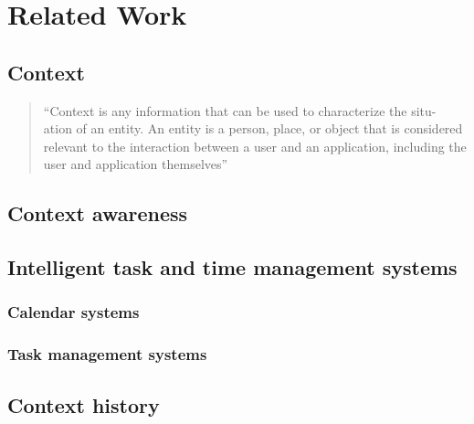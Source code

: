 \chapter{Related Work}
\label{chap:relatedwork}

\section{Context}
\begin{quote}
``Context is any information that can be used to characterize the situ- ation of an entity.
An entity is a person, place, or object that is considered relevant to the interaction
between a user and an application, including the user and application themselves''
\end{quote}

\section{Context awareness}

\section{Intelligent task and time management systems}

\subsection{Calendar systems}

\subsection{Task management systems}

\section{Context history}
